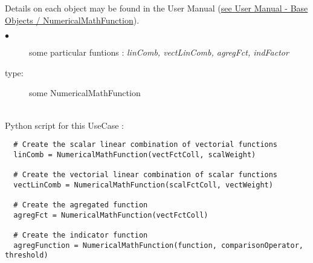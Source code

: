 Details on each object may be found in the User Manual  (\href{OpenTURNS_UserManual_TUI.pdf}{see User Manual - Base Objects / NumericalMathFunction}).\\



{
  \begin{description}
  \item[$\bullet$] some particular funtions : {\itshape linComb, vectLinComb, agregFct, indFactor}
  \item[type:] some NumericalMathFunction
  \end{description}
}

\textspace\\
Python script for this UseCase :

\begin{lstlisting}
  # Create the scalar linear combination of vectorial functions
  linComb = NumericalMathFunction(vectFctColl, scalWeight)

  # Create the vectorial linear combination of scalar functions
  vectLinComb = NumericalMathFunction(scalFctColl, vectWeight)

  # Create the agregated function
  agregFct = NumericalMathFunction(vectFctColl)

  # Create the indicator function
  agregFunction = NumericalMathFunction(function, comparisonOperator, threshold)
\end{lstlisting}
